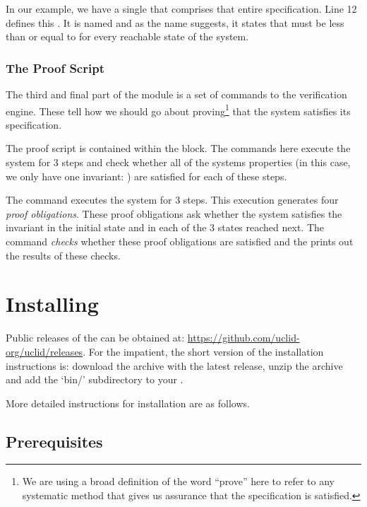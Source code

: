 In our example, we have a single  that comprises that entire specification. Line 12 defines this . It is named  and as the name suggests, it states that  must be less than or equal to  for every reachable state of the system.

\subsubsection{The Proof Script}
The third and final part of the \uclid{} module is a set of commands to the \uclid{} verification engine. These tell how we should go about proving\footnote{We are using a broad definition of the word ``prove'' here to refer to any systematic method that gives us assurance that the specification is satisfied.} that the system satisfies its specification.

The proof script is contained within the  block. The commands here execute the system for 3 steps and check whether all of the systems properties (in this case, we only have one invariant: ) are satisfied for each of these steps. 

The command  executes the system for 3 steps. This execution generates four \emph{proof obligations}. These proof obligations ask whether the system satisfies the invariant  in the initial state and in each of the 3 states reached next. The  command \emph{checks} whether these proof obligations are satisfied and the  prints out the results of these checks.

\section{Installing \uclid{}}

Public releases of the \uclid{} can be obtained at: \url{https://github.com/uclid-org/uclid/releases}. For the impatient, the short version of the installation instructions is: download the archive with the latest release, unzip the archive and add the `bin/' subdirectory to your . 

More detailed instructions for installation are as follows.

\subsection{Prerequisites}

